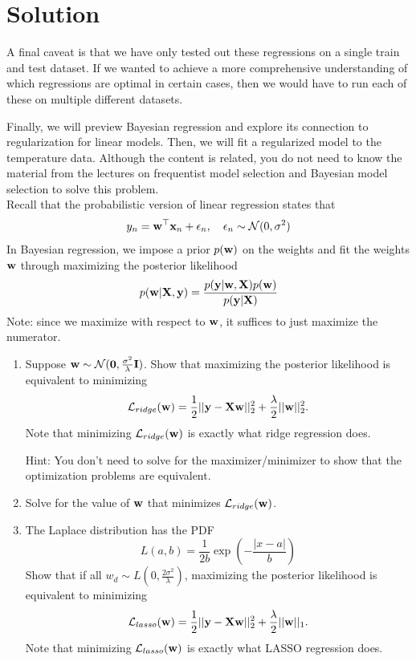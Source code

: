 \documentclass[submit]{../harvardml}
\newenvironment{solution}
  {\color{blue}\section*{Solution}}
{}
\begin{document}
\begin{solution}
\begin{enumerate}
    \newline \newline
    A final caveat is that we have only tested out these regressions on a single train and test dataset. If we wanted to achieve a more comprehensive understanding of which regressions are optimal in certain cases, then we would have to run each of these on multiple different datasets.
\end{enumerate}
\end{solution}
\begin{problem}

Finally, we will preview Bayesian regression and explore its connection to regularization for linear models. Then, we will fit a regularized model to the temperature data. Although the content is related, you do not need to know the material from the lectures on frequentist model selection and Bayesian model selection to solve this problem.  \\

\noindent Recall that the probabilistic version of linear regression states that 
\[y_n = \mathbf{w}^\top\mathbf{x}_n + \epsilon_n, \quad \epsilon_n \sim \mathcal{N}(0, \sigma^2)\]
In Bayesian regression, we impose a prior $p(\mathbf{w})$ on the weights and  fit the weights $\mathbf{w}$ through maximizing the posterior likelihood
\[p(\mathbf{w} | \mathbf{X}, \mathbf{y}) = \frac{p(\bold y | \mathbf{w}, \mathbf{X})p(\mathbf{w})}{p(\mathbf{y} | \mathbf{X})}\]
Note: since we maximize with respect to $\mathbf{w}$, it suffices to just maximize the numerator.

\begin{enumerate}
    \item Suppose $\mathbf{w} \sim \mathcal{N}(\mathbf{0},\frac{\sigma^2}{\lambda}\mathbf{I})$. Show that maximizing the posterior likelihood is equivalent to minimizing 
    \[\mathcal{L}_{ridge}(\mathbf{w}) = \frac{1}{2}||\mathbf{y} -\bold X\mathbf{w}||_2^2 + \frac{\lambda}{2}||\mathbf{w}||_2^2.\] 
    Note that minimizing $\mathcal{L}_{ridge}(\mathbf{w})$ is exactly what ridge regression does.
    
    Hint: You don't need to solve for the maximizer/minimizer to show that the optimization problems are equivalent.
    
    \item Solve for the value of $\mathbf{w}$ that minimizes $\mathcal L_{ridge}(\mathbf{w})$.

    \item The Laplace distribution has the PDF
   \[L(a,b) =\frac{1}{2b} \exp\left(-\frac{|x - a|}{b}\right)\]
Show that if all $w_d \sim L\left(0,\frac{2\sigma^2}{\lambda}\right)$, maximizing the posterior likelihood is equivalent to minimizing 
\[\mathcal{L}_{lasso}(\mathbf{w}) = \frac{1}{2}||\mathbf{y} -\bold X\mathbf{w}||_2^2  + \frac{\lambda}{2}||\mathbf{w}||_1.\] 
Note that minimizing $\mathcal{L}_{lasso}(\mathbf{w})$ is exactly what LASSO regression does.


\end{enumerate}
\end{problem}
\end{document}
